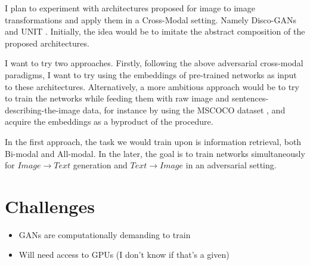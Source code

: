 \documentclass[12pt]{article}
\begin{document}
I plan to experiment with architectures proposed for image to image transformations and apply them in a Cross-Modal setting. Namely Disco-GANs \cite{DBLP:journals/corr/KimCKLK17} and UNIT \cite{DBLP:journals/corr/LiuBK17} . Initially, the idea would be to imitate the abstract composition of the proposed architectures.

I want to try two approaches. Firstly, following the above adversarial cross-modal paradigms, I want to try using the embeddings of pre-trained networks as input to these architectures. Alternatively, a more ambitious approach would be to try to train the networks while feeding them with raw image and sentences-describing-the-image data, for instance by using the MSCOCO dataset \cite{DBLP:journals/corr/LiuBK17}, and acquire the embeddings as a byproduct of the procedure. 

In the first approach, the task we would train upon is information retrieval, both Bi-modal and All-modal. In the later, the goal is to train networks simultaneously for $Image \rightarrow Text$ generation \cite{Karpathy:2017:DVA:3069214.3069250} and $Text \rightarrow Image$ \cite{DBLP:journals/corr/ReedAYLSL16} in an adversarial setting.

\section{Challenges}

\begin{itemize}
    \item GANs are computationally demanding to train 
    \item Will need access to GPUs (I don't know if that's a given)
\end{itemize}










{}

\end{document}
